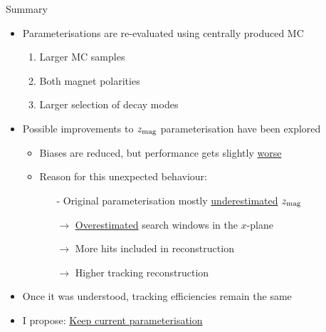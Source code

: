 \documentclass[xcolor={dvipsnames}]{beamer}
\begin{document}
\begin{frame}{Summary}
  \vspace{0.0cm}
  \begin{itemize}
    \setlength\itemsep{1.0em}
    \item{Parameterisations are re-evaluated using centrally produced MC}
    \begin{enumerate}
      \item{Larger MC samples}
      \item{Both magnet polarities}
      \item{Larger selection of decay modes}
    \end{enumerate}
    \item{Possible improvements to $z_{\rm mag}$ parameterisation have been explored}
    \begin{itemize}
      \setlength\itemsep{0.3em}
      \item{Biases are reduced, but performance gets slightly \underline{worse}}
      \item{Reason for this unexpected behaviour:}
      \begin{itemize}
        \item[-]{Original parameterisation mostly \underline{underestimated} $z_{\rm mag}$}
        \item[$\to$]{\underline{Overestimated} search windows in the $x$-plane}
        \item[$\to$]{More hits included in reconstruction}
        \item[$\to$]{Higher tracking reconstruction}
      \end{itemize}
    \end{itemize}
    \item{Once it was understood, tracking efficiencies remain the same}
    \item{I propose: \underline{Keep current parameterisation}}
  \end{itemize}
\end{frame}
\end{document}
